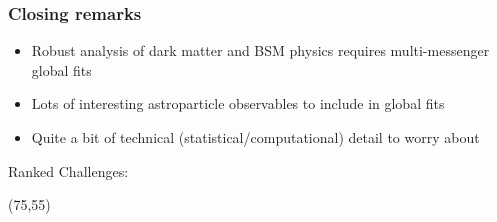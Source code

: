 \documentclass[xcolor=dvipsnames]{beamer}
\begin{document}
\begin{frame}
\frametitle{Closing remarks}

\begin{itemize}
\item{Robust analysis of dark matter and BSM physics requires multi-messenger global fits}
\item{Lots of interesting astroparticle observables to include in global fits}
\item{Quite a bit of technical (statistical/computational) detail to worry about}
\end{itemize}

Ranked Challenges:
\begin{enumerate}
\end{enumerate}

\begin{textblock}{20}(75,55)
\end{textblock}

\end{frame}
\end{document}
